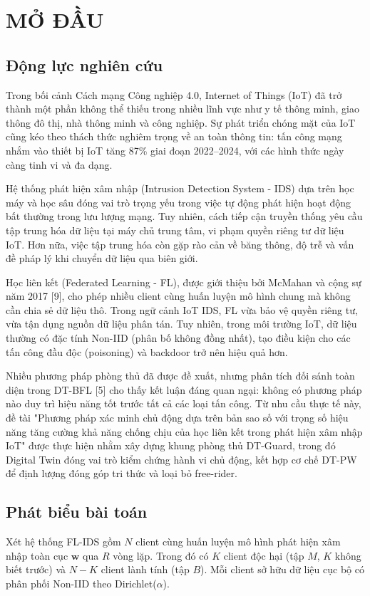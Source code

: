 \chapter{MỞ ĐẦU}
\label{Chapter1}

\section{Động lực nghiên cứu}
Trong bối cảnh Cách mạng Công nghiệp 4.0, Internet of Things (IoT) đã trở thành một phần không thể thiếu trong nhiều lĩnh vực như y tế thông minh, giao thông đô thị, nhà thông minh và công nghiệp. Sự phát triển chóng mặt của IoT cũng kéo theo thách thức nghiêm trọng về an toàn thông tin: tấn công mạng nhắm vào thiết bị IoT tăng 87\% giai đoạn 2022--2024, với các hình thức ngày càng tinh vi và đa dạng.

Hệ thống phát hiện xâm nhập (Intrusion Detection System - IDS) dựa trên học máy và học sâu đóng vai trò trọng yếu trong việc tự động phát hiện hoạt động bất thường trong lưu lượng mạng. Tuy nhiên, cách tiếp cận truyền thống yêu cầu tập trung hóa dữ liệu tại máy chủ trung tâm, vi phạm quyền riêng tư dữ liệu IoT. Hơn nữa, việc tập trung hóa còn gặp rào cản về băng thông, độ trễ và vấn đề pháp lý khi chuyển dữ liệu qua biên giới.

Học liên kết (Federated Learning - FL), được giới thiệu bởi McMahan và cộng sự năm 2017 {[}9{]}, cho phép nhiều client cùng huấn luyện mô hình chung mà không cần chia sẻ dữ liệu thô. Trong ngữ cảnh IoT IDS, FL vừa bảo vệ quyền riêng tư, vừa tận dụng nguồn dữ liệu phân tán. Tuy nhiên, trong môi trường IoT, dữ liệu thường có đặc tính Non-IID (phân bố không đồng nhất), tạo điều kiện cho các tấn công đầu độc (poisoning) và backdoor trở nên hiệu quả hơn.

Nhiều phương pháp phòng thủ đã được đề xuất, nhưng phân tích đối sánh toàn diện trong DT-BFL {[}5{]} cho thấy kết luận đáng quan ngại: không có phương pháp nào duy trì hiệu năng tốt trước tất cả các loại tấn công. Từ nhu cầu thực tế này, đề tài "Phương pháp xác minh chủ động dựa trên bản sao số với trọng số hiệu năng tăng cường khả năng chống chịu của học liên kết trong phát hiện xâm nhập IoT" được thực hiện nhằm xây dựng khung phòng thủ DT-Guard, trong đó Digital Twin đóng vai trò kiểm chứng hành vi chủ động, kết hợp cơ chế DT-PW để định lượng đóng góp tri thức và loại bỏ free-rider.

\section{Phát biểu bài toán}
Xét hệ thống FL-IDS gồm $N$ client cùng huấn luyện mô hình phát hiện xâm nhập toàn cục $\mathbf{w}$ qua $R$ vòng lặp. Trong đó có $K$ client độc hại (tập $M$, $K$ không biết trước) và $N - K$ client lành tính (tập $B$). Mỗi client sở hữu dữ liệu cục bộ có phân phối Non-IID theo Dirichlet($\alpha$).

